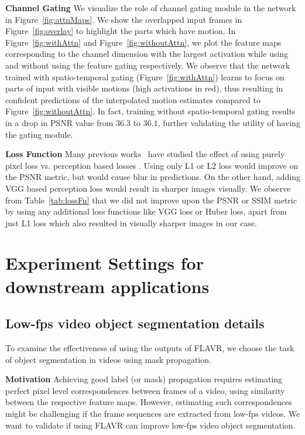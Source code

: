 \documentclass[10pt,twocolumn,letterpaper]{article}
\newcommand{\figref}[1]{Figure~\ref{#1}}
\newcommand{\tabref}[1]{Table~\ref{#1}}
\newcommand{\Ours}{FLAVR}
\begin{document}
{\bf Channel Gating} We visualize the role of channel gating module in the network in \figref{fig:attnMaps}. We show the overlapped input frames in \figref{fig:overlay} to highlight the parts which have motion. In \figref{fig:withAttn} and \figref{fig:withoutAttn}, we plot the feature maps corresponding to the channel dimension with the largest activation while using and without using the feature gating respectively. We observe that the network trained with spatio-temporal gating (\figref{fig:withAttn}) learns to focus on parts of input with visible motions (high activations in red), thus resulting in confident predictions of the interpolated motion estimates compared to \figref{fig:withoutAttn}. In fact, training without spatio-temporal gating results in a drop in PSNR value from $36.3$ to $36.1$, further validating the utility of having the gating module.

{\bf Loss Function} Many previous works~\cite{niklaus2017video} have studied the effect of using purely pixel loss vs. perception based losses \cite{johnson2016perceptual}. Using only L1 or L2 loss would improve on the PSNR metric, but would cause blur in predictions. On the other hand, adding VGG based perception loss would result in sharper images visually. We observe from \tabref{tab:lossFn} that we did not improve upon the PSNR or SSIM metric by using any additional loss functions like VGG loss or Huber loss, apart from just L1 loss which also resulted in visually sharper images in our case.  

\section{Experiment Settings for downstream applications}

\subsection{Low-fps video object segmentation details}


To examine the effectiveness of using the outputs of \Ours{}, we choose the task of object segmentation in videos using mask propagation. 

{\bf Motivation} Achieving good label (or mask) propagation requires estimating perfect pixel level correspondences between frames of a video, using similarity between the respective feature maps. However, estimating such correspondences might be challenging if the frame sequences are extracted from low-fps videos. We want to validate if using \Ours{} can improve low-fps video object segmentation.
\end{document}
